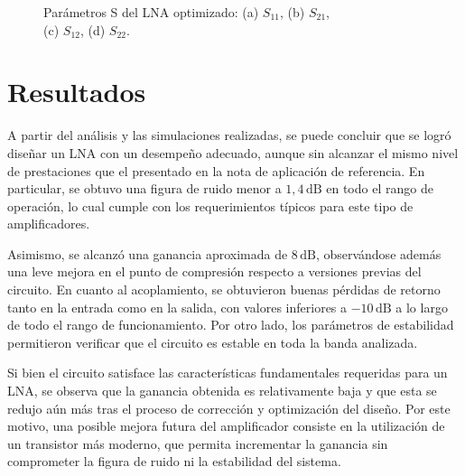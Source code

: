\begin{figure}[htbp]
\captionsetup{justification=centering}
\caption{Parámetros S del LNA optimizado: (a) $S_{11}$, (b) $S_{21}$, \\ (c) $S_{12}$, (d) $S_{22}$.}
\label{fig:parametros_s_opt}
\end{figure}

\newpage
\section{Resultados}
A partir del análisis y las simulaciones realizadas, se puede concluir que se logró diseñar un LNA con un desempeño adecuado, aunque sin alcanzar el mismo nivel de prestaciones que el presentado en la nota de aplicación de referencia. En particular, se obtuvo una figura de ruido menor a $1{,}4\,\text{dB}$ en todo el rango de operación, lo cual cumple con los requerimientos típicos para este tipo de amplificadores.

Asimismo, se alcanzó una ganancia aproximada de $8\,\text{dB}$, observándose además una leve mejora en el punto de compresión respecto a versiones previas del circuito. En cuanto al acoplamiento, se obtuvieron buenas pérdidas de retorno tanto en la entrada como en la salida, con valores inferiores a $-10\,\text{dB}$ a lo largo de todo el rango de funcionamiento. Por otro lado, los parámetros de estabilidad permitieron verificar que el circuito es estable en toda la banda analizada.

Si bien el circuito satisface las características fundamentales requeridas para un LNA, se observa que la ganancia obtenida es relativamente baja y que esta se redujo aún más tras el proceso de corrección y optimización del diseño. Por este motivo, una posible mejora futura del amplificador consiste en la utilización de un transistor más moderno, que permita incrementar la ganancia sin comprometer la figura de ruido ni la estabilidad del sistema.

